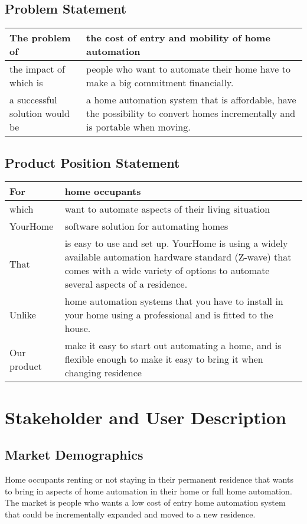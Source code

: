 \documentclass[12pt,norsk,a4paper]{article}
\begin{document}
\subsection{Problem Statement}
\begin{tabularx}{\textwidth}{lX}
\toprule
The problem of & the cost of entry and mobility of home automation \\
\midrule
the impact of which is & people who want to automate their home have to make a big commitment
financially. \\
\midrule
a successful solution would be & a home automation system that is affordable, have the possibility
to convert homes incrementally and is portable when moving. \\
\bottomrule
\end{tabularx}

\subsection{Product Position Statement}
\begin{tabularx}{\textwidth}{lX}
\toprule
For & home occupants \\
\midrule

which & want to automate aspects of their living situation \\
\midrule

YourHome & software solution for automating homes \\

\midrule
That & is easy to use and set up. YourHome is using a widely available automation hardware standard
(Z-wave) that comes with a wide variety of options to automate several aspects of a residence. \\

\midrule
Unlike & home automation systems that you have to install in your home using a professional and is
fitted to the house. \\

\midrule
Our product & make it easy to start out automating a home, and is flexible enough to make it easy to
bring it when changing residence \\
\bottomrule
\end{tabularx}

\section{Stakeholder and User Description}
\subsection{Market Demographics}
Home occupants renting or not staying in their permanent residence that wants to bring in aspects of
home automation in their home or full home automation. The market is people who wants a low cost of entry home
automation system that could be incrementally expanded and moved to a new residence.
\end{document}
